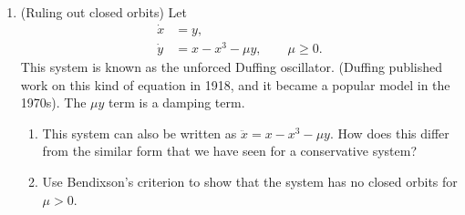 \documentclass[12pt]{amsart}
\theoremstyle{plain}
\theoremstyle{definition}
\theoremstyle{definition}
\theoremstyle{plain}
\newenvironment{solution}
{\begin{proof}[Solution]}
{\end{proof}}
\newcommand{\dd}{\mathop{}\!\mathrm{d}}
\begin{document}
\begin{enumerate}[start=2]
\begin{solution}
\begin{enumerate}[label=(\alph*),leftmargin=*]
            \item To leading order, $x(t)\approx A\cos t$ and
            $\dot x(t)\approx-A\sin t$. Thus
            \begin{align*}
                \Delta E
                &\approx-\epsilon\int_0^{2\pi}
                    A^2\sin^2t\,(A^2\cos^2t-1)\,\dd t\\
                &=-\epsilon\left(A^4\frac\pi4-A^2\pi\right)\\
                &=\epsilon\pi A^2\left(1-\frac{A^2}{4}\right).
            \end{align*}
            Here the supplied average identities give
            $\int_0^{2\pi}\sin^2t\,\dd t=\pi$ and
            $\int_0^{2\pi}\cos^2t\sin^2t\,\dd t=\pi/4$.
            Setting the leading energy change to zero yields
            $A=0$ or $A^2=4$. The zero solution is the equilibrium, so
            the nontrivial cycle has
            \[
                \boxed{A\approx2,\qquad T\approx2\pi.}
            \]
            For $0<A<2$, $\Delta E>0$; for $A>2$, $\Delta E<0$.
            Thus the orange inner trajectory expands and the green outer
            trajectory contracts toward the same approximately circular
            orbit $x^2+\dot x^2\approx4$, as shown in the figure.
            The sinusoid is a leading approximation for small positive
            $\epsilon$, not an exact solution of the nonlinear equation.
        \end{enumerate}
        \end{solution}

        \setcounter{enumi}{2}
        \item (Ruling out closed orbits) Let
        \[\begin{aligned}\dot x&=y,\\\dot y&=x-x^3-\mu y,\qquad\mu\geq0.\end{aligned}\]
        This system is known as the unforced Duffing oscillator. (Duffing published work on this kind of equation in 1918, and it became a popular model in the 1970s). The $\mu y$ term is a damping term.
        \begin{enumerate}
            \item This system can also be written as $\ddot x=x-x^3-\mu y$. How does this differ from the similar form that we have seen for a conservative system?
            \item Use Bendixson's criterion to show that the system has no closed orbits for $\mu>0$.
        \end{enumerate}


\end{enumerate}
\end{document}
